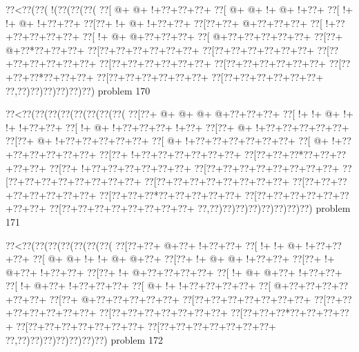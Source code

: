 \vbox{\vbox{\goo
\0??<\0??(\0??(\- !(\0??(\0??(\0??(
\0??[\- @+\- @+\- !+\0??+\0??+\0??+
\0??[\- @+\- @+\- !+\- @+\- !+\0??+
\0??[\- !+\- !+\- @+\- !+\0??+\0??+
\0??[\0??+\- !+\- @+\- !+\0??+\0??+
\0??[\0??+\0??+\- @+\0??+\0??+\0??+
\0??[\- !+\0??+\0??+\0??+\0??+\0??+
\0??[\- !+\- @+\- @+\0??+\0??+\0??+
\0??[\- @+\0??+\0??+\0??+\0??+\0??+
\0??[\0??+\- @+\0??*\0??+\0??+\0??+
\0??[\0??+\0??+\0??+\0??+\0??+\0??+
\0??[\0??+\0??+\0??+\0??+\0??+\0??+
\0??[\0??+\0??+\0??+\0??+\0??+\0??+
\0??[\0??+\0??+\0??+\0??+\0??+\0??+
\0??[\0??+\0??+\0??+\0??+\0??+\0??+
\0??[\0??+\0??+\0??*\0??+\0??+\0??+
\0??[\0??+\0??+\0??+\0??+\0??+\0??+
\0??[\0??+\0??+\0??+\0??+\0??+\0??+
\0??,\0??)\0??)\0??)\0??)\0??)\0??)
}
\hfil problem 170\hfil\break
}

\vbox{\vbox{\goo
\0??<\0??(\0??(\0??(\0??(\0??(\0??(\0??(\0??(
\0??[\0??+\- @+\- @+\- @+\- @+\0??+\0??+\0??+
\0??[\- !+\- !+\- @+\- !+\- !+\- !+\0??+\0??+
\0??[\- !+\- @+\- !+\0??+\0??+\0??+\- !+\0??+
\0??[\0??+\- @+\- !+\0??+\0??+\0??+\0??+\0??+
\0??[\0??+\- @+\- !+\0??+\0??+\0??+\0??+\0??+
\0??[\- @+\- !+\0??+\0??+\0??+\0??+\0??+\0??+
\0??[\- @+\- !+\0??+\0??+\0??+\0??+\0??+\0??+
\0??[\0??+\- !+\0??+\0??+\0??+\0??+\0??+\0??+
\0??[\0??+\0??+\0??*\0??+\0??+\0??+\0??+\0??+
\0??[\0??+\- !+\0??+\0??+\0??+\0??+\0??+\0??+
\0??[\0??+\0??+\0??+\0??+\0??+\0??+\0??+\0??+
\0??[\0??+\0??+\0??+\0??+\0??+\0??+\0??+\0??+
\0??[\0??+\0??+\0??+\0??+\0??+\0??+\0??+\0??+
\0??[\0??+\0??+\0??+\0??+\0??+\0??+\0??+\0??+
\0??[\0??+\0??+\0??*\0??+\0??+\0??+\0??+\0??+
\0??[\0??+\0??+\0??+\0??+\0??+\0??+\0??+\0??+
\0??[\0??+\0??+\0??+\0??+\0??+\0??+\0??+\0??+
\0??,\0??)\0??)\0??)\0??)\0??)\0??)\0??)\0??)
}
\hfil problem 171\hfil\break
}

\vbox{\vbox{\goo
\0??<\0??(\0??(\0??(\0??(\0??(\0??(\0??(
\0??[\0??+\0??+\- @+\0??+\- !+\0??+\0??+
\0??[\- !+\- !+\- @+\- !+\0??+\0??+\0??+
\0??[\- @+\- @+\- !+\- !+\- @+\- @+\0??+
\0??[\0??+\- !+\- @+\- @+\- !+\0??+\0??+
\0??[\0??+\- !+\- @+\0??+\- !+\0??+\0??+
\0??[\0??+\- !+\- @+\0??+\0??+\0??+\0??+
\0??[\- !+\- @+\- @+\0??+\- !+\0??+\0??+
\0??[\- !+\- @+\0??+\- !+\0??+\0??+\0??+
\0??[\- @+\- !+\- !+\0??+\0??+\0??+\0??+
\0??[\- @+\0??+\0??+\0??+\0??+\0??+\0??+
\0??[\0??+\- @+\0??+\0??+\0??+\0??+\0??+
\0??[\0??+\0??+\0??+\0??+\0??+\0??+\0??+
\0??[\0??+\0??+\0??+\0??+\0??+\0??+\0??+
\0??[\0??+\0??+\0??+\0??+\0??+\0??+\0??+
\0??[\0??+\0??+\0??*\0??+\0??+\0??+\0??+
\0??[\0??+\0??+\0??+\0??+\0??+\0??+\0??+
\0??[\0??+\0??+\0??+\0??+\0??+\0??+\0??+
\0??,\0??)\0??)\0??)\0??)\0??)\0??)\0??)
}
\hfil problem 172\hfil\break
}


